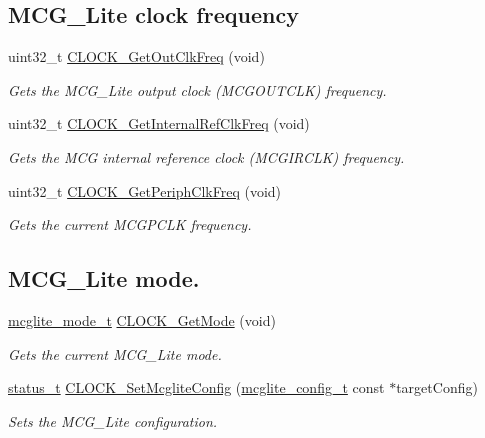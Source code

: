 \subsection*{M\+C\+G\+\_\+\+Lite clock frequency}
\begin{DoxyCompactItemize}
\item 
uint32\+\_\+t \mbox{\hyperlink{group__clock_gad9df7f4196258f0a9037088784a19380}{C\+L\+O\+C\+K\+\_\+\+Get\+Out\+Clk\+Freq}} (void)
\begin{DoxyCompactList}\small\item\em Gets the M\+C\+G\+\_\+\+Lite output clock (M\+C\+G\+O\+U\+T\+C\+LK) frequency. \end{DoxyCompactList}\item 
uint32\+\_\+t \mbox{\hyperlink{group__clock_ga352c4e1fcb54bc5656df3299e154a736}{C\+L\+O\+C\+K\+\_\+\+Get\+Internal\+Ref\+Clk\+Freq}} (void)
\begin{DoxyCompactList}\small\item\em Gets the M\+CG internal reference clock (M\+C\+G\+I\+R\+C\+LK) frequency. \end{DoxyCompactList}\item 
uint32\+\_\+t \mbox{\hyperlink{group__clock_gacee790e56c954e537658600aca0b9481}{C\+L\+O\+C\+K\+\_\+\+Get\+Periph\+Clk\+Freq}} (void)
\begin{DoxyCompactList}\small\item\em Gets the current M\+C\+G\+P\+C\+LK frequency. \end{DoxyCompactList}\end{DoxyCompactItemize}
\subsection*{M\+C\+G\+\_\+\+Lite mode.}
\begin{DoxyCompactItemize}
\item 
\mbox{\hyperlink{group__clock_ga7ba2816f49b1b008daa37a55e34dc4a1}{mcglite\+\_\+mode\+\_\+t}} \mbox{\hyperlink{group__clock_gac486df712cf93a890c084c14956dd750}{C\+L\+O\+C\+K\+\_\+\+Get\+Mode}} (void)
\begin{DoxyCompactList}\small\item\em Gets the current M\+C\+G\+\_\+\+Lite mode. \end{DoxyCompactList}\item 
\mbox{\hyperlink{group__ksdk__common_gaaabdaf7ee58ca7269bd4bf24efcde092}{status\+\_\+t}} \mbox{\hyperlink{group__clock_ga5e63d4acf979a66bf5b332ca27b9d1cc}{C\+L\+O\+C\+K\+\_\+\+Set\+Mcglite\+Config}} (\mbox{\hyperlink{group__clock_gaabff5dfd46b7233a64d3f3e4b47d908d}{mcglite\+\_\+config\+\_\+t}} const $\ast$target\+Config)
\begin{DoxyCompactList}\small\item\em Sets the M\+C\+G\+\_\+\+Lite configuration. \end{DoxyCompactList}\end{DoxyCompactItemize}
